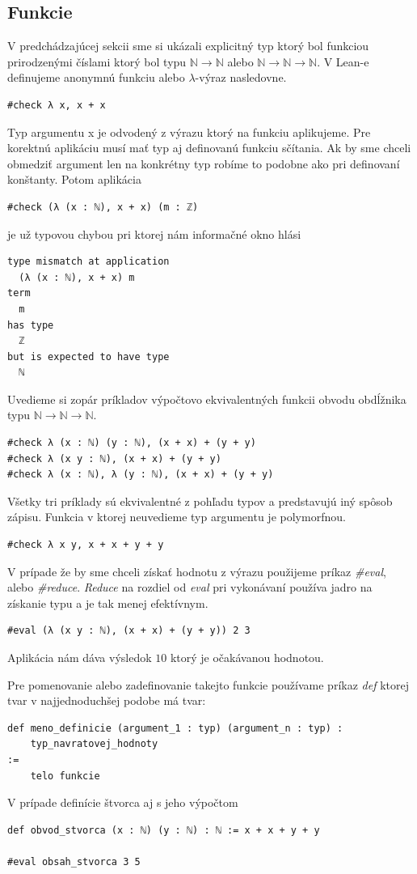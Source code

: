 \documentclass[a4paper,10pt,oneside]{report}%
\begin{document}
\subsection{Funkcie}
    V predchádzajúcej sekcii sme si ukázali explicitný typ ktorý bol funkciou prirodzenými
číslami ktorý bol typu $\mathbb{N} \to \mathbb{N}$ alebo $\mathbb{N} \to \mathbb{N} \to \mathbb{N}$.
V Lean-e definujeme anonymnú funkciu alebo $\lambda$-výraz nasledovne.
\begin{lstlisting}
#check λ x, x + x
\end{lstlisting}
    Typ argumentu x je odvodený z výrazu ktorý na funkciu aplikujeme.
    Pre korektnú aplikáciu musí mať typ aj definovanú funkciu sčítania.
    Ak by sme chceli obmedziť argument len na konkrétny typ robíme to podobne ako
pri definovaní konštanty. Potom aplikácia
\begin{lstlisting}
#check (λ (x : ℕ), x + x) (m : ℤ)
\end{lstlisting}
je už typovou chybou pri ktorej nám informačné okno hlási
\begin{lstlisting}
type mismatch at application
  (λ (x : ℕ), x + x) m
term
  m
has type
  ℤ
but is expected to have type
  ℕ
\end{lstlisting}
    Uvedieme si zopár príkladov výpočtovo ekvivalentných funkcii obvodu obdĺžnika typu
$\mathbb{N} \to \mathbb{N} \to \mathbb{N}$.
\begin{lstlisting}
#check λ (x : ℕ) (y : ℕ), (x + x) + (y + y)
#check λ (x y : ℕ), (x + x) + (y + y)
#check λ (x : ℕ), λ (y : ℕ), (x + x) + (y + y)
\end{lstlisting}
    Všetky tri príklady sú ekvivalentné z pohľadu typov a predstavujú iný spôsob
zápisu.
    Funkcia v ktorej neuvedieme typ argumentu je polymorfnou.
\begin{lstlisting}
#check λ x y, x + x + y + y
\end{lstlisting}

    V prípade že by sme chceli získať hodnotu z výrazu použijeme príkaz \emph{\#eval},
alebo \emph{\#reduce}. \emph{Reduce} na rozdiel od \emph{eval} pri vykonávaní používa
jadro na získanie typu a je tak menej efektívnym.
\begin{lstlisting}
#eval (λ (x y : ℕ), (x + x) + (y + y)) 2 3
\end{lstlisting}
    Aplikácia nám dáva výsledok $10$ ktorý je očakávanou hodnotou.

    Pre pomenovanie alebo zadefinovanie takejto funkcie používame príkaz \emph{def}
ktorej tvar v najjednoduchšej podobe má tvar:
\begin{lstlisting}
def meno_definicie (argument_1 : typ) (argument_n : typ) :
    typ_navratovej_hodnoty 
:=
    telo funkcie
\end{lstlisting}
V prípade definície štvorca aj s jeho výpočtom
\begin{lstlisting}
def obvod_stvorca (x : ℕ) (y : ℕ) : ℕ := x + x + y + y

#eval obsah_stvorca 3 5
\end{lstlisting}
\end{document}
